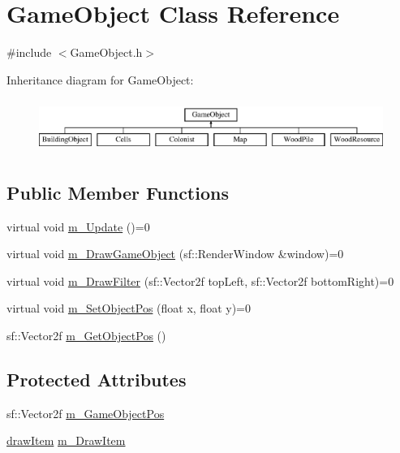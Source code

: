 \hypertarget{class_game_object}{}\section{Game\+Object Class Reference}
\label{class_game_object}


{\ttfamily \#include $<$Game\+Object.\+h$>$}

Inheritance diagram for Game\+Object\+:\begin{figure}[H]
\begin{center}
\leavevmode
\includegraphics[height=1.761006cm]{class_game_object}
\end{center}
\end{figure}
\subsection*{Public Member Functions}
\begin{DoxyCompactItemize}
\item 
virtual void \mbox{\hyperlink{class_game_object_a3af5a7b470e09f13a1422439fc6a9ba8}{m\+\_\+\+Update}} ()=0
\item 
virtual void \mbox{\hyperlink{class_game_object_a184ac59fd5167c55a54b50894e5b6721}{m\+\_\+\+Draw\+Game\+Object}} (sf\+::\+Render\+Window \&window)=0
\item 
virtual void \mbox{\hyperlink{class_game_object_af1a0662ca445d878b163c4648f90259c}{m\+\_\+\+Draw\+Filter}} (sf\+::\+Vector2f top\+Left, sf\+::\+Vector2f bottom\+Right)=0
\item 
virtual void \mbox{\hyperlink{class_game_object_ad1f8ea8eb3673b1af8215bf92cdc0df8}{m\+\_\+\+Set\+Object\+Pos}} (float x, float y)=0
\item 
sf\+::\+Vector2f \mbox{\hyperlink{class_game_object_a3ab12f6c943557e7ab6d9f56f4bb4953}{m\+\_\+\+Get\+Object\+Pos}} ()
\end{DoxyCompactItemize}
\subsection*{Protected Attributes}
\begin{DoxyCompactItemize}
\item 
sf\+::\+Vector2f \mbox{\hyperlink{class_game_object_a8d07ca1aef7f289bb8cbdca91c0f3f82}{m\+\_\+\+Game\+Object\+Pos}}
\item 
\mbox{\hyperlink{_game_object_8h_a9609a9a703d8f2cd54b9490ab5375b1f}{draw\+Item}} \mbox{\hyperlink{class_game_object_a2e0b93a38fc8523e1be5790e647e6be3}{m\+\_\+\+Draw\+Item}}
\end{DoxyCompactItemize}



